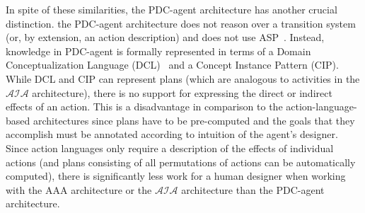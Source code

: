 In spite of these similarities, the PDC-agent architecture has another crucial distinction.
the PDC-agent architecture does not reason over a transition system (or, by extension, an action description) and does not use ASP~\citep{liao_extended_2006}.
Instead, knowledge in PDC-agent is formally represented in terms of a Domain Conceptualization Language (DCL)~\citep{ji_gao_sasa5_2005} and a Concept Instance Pattern (CIP)\footnotemark.
While DCL and CIP can represent plans (which are analogous to activities in the $\mathcal{AIA}$ architecture), there is no support for expressing the direct or indirect effects of an action.
This is a disadvantage in comparison to the action-language-based architectures since plans have to be pre-computed and the goals that they accomplish must be annotated according to intuition of the agent's designer.
Since action languages only require a description of the effects of individual actions (and plans consisting of all permutations of actions can be automatically computed), there is significantly less work for a human designer when working with the AAA architecture or the $\mathcal{AIA}$ architecture than the PDC-agent architecture.


